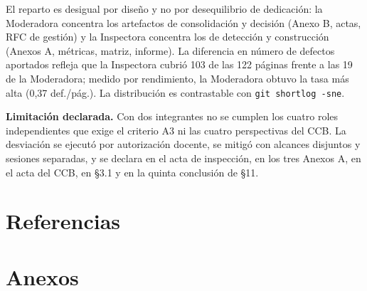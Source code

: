 \documentclass[11pt,letterpaper]{article}
\begin{document}
El reparto es desigual por diseño y no por desequilibrio de dedicación: la Moderadora concentra los artefactos de consolidación y decisión (Anexo B, actas, RFC de gestión) y la Inspectora concentra los de detección y construcción (Anexos A, métricas, matriz, informe). La diferencia en número de defectos aportados refleja que la Inspectora cubrió 103 de las 122 páginas frente a las 19 de la Moderadora; medido por rendimiento, la Moderadora obtuvo la tasa más alta (0,37 def./pág.). La distribución es contrastable con \texttt{git shortlog -sne}.

\textbf{Limitación declarada.} Con dos integrantes no se cumplen los cuatro roles independientes que exige el criterio A3 ni las cuatro perspectivas del CCB. La desviación se ejecutó por autorización docente, se mitigó con alcances disjuntos y sesiones separadas, y se declara en el acta de inspección, en los tres Anexos A, en el acta del CCB, en \S3.1 y en la quinta conclusión de \S11.

\newpage
\section{Referencias}



\newpage
\section{Anexos}
\end{document}
